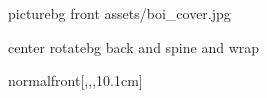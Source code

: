 \documentclass[
    coverwidth=21.6cm,
    coverheight=30.2cm,
    spinewidth=0.3cm,
    flapwidth=0cm,
    bleedwidth=5mm,
    marklength=5mm,
    ]{bookcover}
\begin{document}
\begin{bookcover}


\begin{bookcoverelement}{picture}{bg front}
assets/boi_cover.jpg
\end{bookcoverelement}

\begin{bookcoverelement}{center rotate}{bg back and spine and wrap}
\end{bookcoverelement}



\begin{bookcoverelement}{normal}{front}[,,,10.1cm]
    \centering
    \contourlength{1pt} %
\end{bookcoverelement}

%    

\end{bookcover}

\begin{bookcover}
\end{bookcover}
\end{document}
